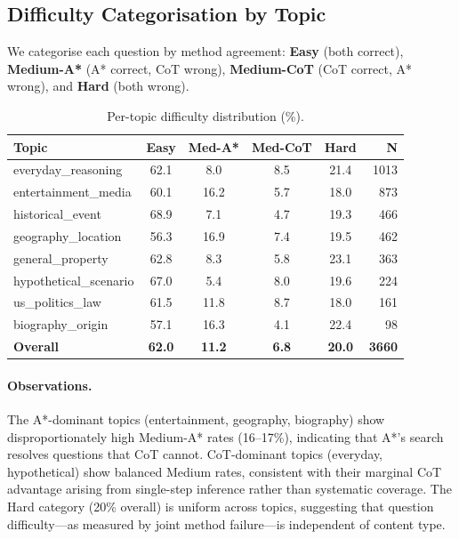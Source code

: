 \documentclass{article}
\begin{document}
\subsection{Difficulty Categorisation by Topic}
\label{app:difficulty}

We categorise each question by method agreement: \textbf{Easy} (both correct),
\textbf{Medium-A*} (A* correct, CoT wrong), \textbf{Medium-CoT} (CoT correct,
A* wrong), and \textbf{Hard} (both wrong).

\begin{table}[h]
\centering
\caption{Per-topic difficulty distribution (\%).}
\label{tab:difficulty_topic}
\small
\begin{tabular}{@{}lccccr@{}}
\toprule
\textbf{Topic} & \textbf{Easy} & \textbf{Med-A*} & \textbf{Med-CoT} & \textbf{Hard} & \textbf{N} \\
\midrule
everyday\_reasoning      & 62.1 & 8.0  & 8.5  & 21.4 & 1013 \\
entertainment\_media     & 60.1 & 16.2 & 5.7  & 18.0 & 873 \\
historical\_event        & 68.9 & 7.1  & 4.7  & 19.3 & 466 \\
geography\_location      & 56.3 & 16.9 & 7.4  & 19.5 & 462 \\
general\_property        & 62.8 & 8.3  & 5.8  & 23.1 & 363 \\
hypothetical\_scenario   & 67.0 & 5.4  & 8.0  & 19.6 & 224 \\
us\_politics\_law        & 61.5 & 11.8 & 8.7  & 18.0 & 161 \\
biography\_origin        & 57.1 & 16.3 & 4.1  & 22.4 & 98 \\
\midrule
\textbf{Overall}         & \textbf{62.0} & \textbf{11.2} & \textbf{6.8} & \textbf{20.0} & \textbf{3660} \\
\bottomrule
\end{tabular}
\end{table}

\paragraph{Observations.}
The A*-dominant topics (entertainment, geography, biography) show
disproportionately high Medium-A* rates (16--17\%), indicating that A*'s
search resolves questions that CoT cannot.  CoT-dominant topics (everyday,
hypothetical) show balanced Medium rates, consistent with their marginal CoT
advantage arising from single-step inference rather than systematic coverage.
The Hard category (20\% overall) is uniform across topics, suggesting that
question difficulty---as measured by joint method failure---is independent of
content type.
\end{document}
